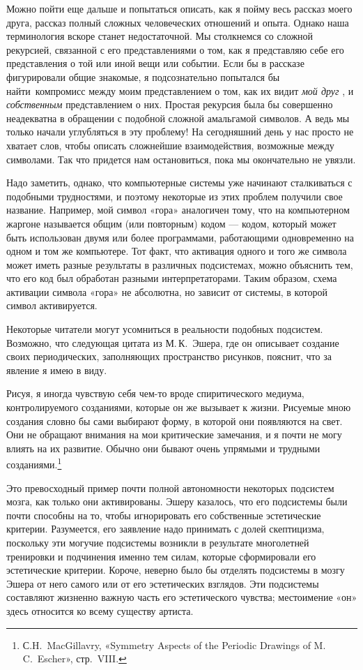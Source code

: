 \documentclass[../main.tex]{subfiles}
\begin{document}
Можно пойти еще дальше и попытаться описать, как я пойму весь рассказ моего друга, рассказ полный сложных человеческих отношений и опыта. Однако наша терминология вскоре станет недостаточной. Мы столкнемся со сложной рекурсией, связанной с его представлениями о том, как я представляю себе его представления о той или иной вещи или событии. Если бы в рассказе фигурировали общие знакомые, я подсознательно попытался бы найти~компромисс между моим представлением о том, как их видит \emph{мой друг} , и \emph{собственным} представлением о них. Простая рекурсия была бы совершенно неадекватна в обращении с подобной сложной амальгамой символов. А ведь мы только начали углубляться в эту проблему! На сегодняшний день у нас просто не хватает слов, чтобы описать сложнейшие взаимодействия, возможные между символами. Так что придется нам остановиться, пока мы окончательно не увязли.

Надо заметить, однако, что компьютерные системы уже начинают сталкиваться с подобными трудностями, и поэтому некоторые из этих проблем получили свое название. Например, мой символ «гора» аналогичен тому, что на компьютерном жаргоне называется общим (или повторным) кодом --- кодом, который может быть использован двумя или более программами, работающими одновременно на одном и том же компьютере. Тот факт, что активация одного и того же символа может иметь разные результаты в различных подсистемах, можно объяснить тем, что его код был обработан разными интерпретаторами. Таким образом, схема активации символа «гора» не абсолютна, но зависит от системы, в которой символ активируется.

Некоторые читатели могут усомниться в реальности подобных подсистем. Возможно, что следующая цитата из М.\,К.~Эшера, где он описывает создание своих периодических, заполняющих пространство рисунков, пояснит, что за явление я имею в виду.

Рисуя, я иногда чувствую себя чем-то вроде спиритического медиума, контролируемого созданиями, которые он же вызывает к жизни. Рисуемые мною создания словно бы сами выбирают форму, в которой они появляются на свет. Они не обращают внимания на мои критические замечания, и я почти не могу влиять на их развитие. Обычно они бывают очень упрямыми и трудными созданиями.\footnote{С.H.~MacGillavry, «Symmetry Aspects of the Periodic Drawings of M.\,C.~Escher», стр.~VIII.}

Это превосходный пример почти полной автономности некоторых подсистем мозга, как только они активированы. Эшеру казалось, что его подсистемы были почти способны на то, чтобы игнорировать его собственные эстетические критерии. Разумеется, его заявление надо принимать с долей скептицизма, поскольку эти могучие подсистемы возникли в результате многолетней тренировки и подчинения именно тем силам, которые сформировали его эстетические критерии. Короче, неверно было бы отделять подсистемы в мозгу Эшера от него самого или от его эстетических взглядов. Эти подсистемы составляют жизненно важную часть его эстетического чувства; местоимение «он» здесь относится ко всему существу артиста.
\end{document}
